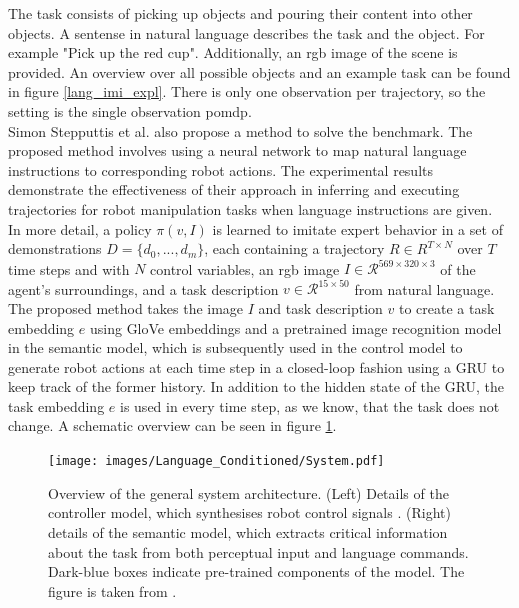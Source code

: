 The task consists of picking up objects and pouring their content into other objects. A sentense in natural language describes the task and the object. 
For example "Pick up the red cup". Additionally, an rgb image of the scene is provided. An overview over 
all possible objects and an example task can be found in figure \ref{lang_imi_expl}. 
There is only one observation per trajectory, so the setting is the single observation \ac{pomdp}.  \\


Simon Stepputtis et al. \cite{stepputtis2020languageconditioned} also propose a method to solve the benchmark. 
The proposed method involves using a neural network to map natural language instructions to 
corresponding robot actions. The experimental results demonstrate the effectiveness of their approach in inferring and executing trajectories for robot manipulation 
tasks when language instructions are given. \\

In more detail, a policy $\pi(v,I)$ is learned to imitate expert behavior in a set of demonstrations $D = \{d_0,...,d_m\}$, each containing a trajectory 
$R \in R^{T \times N}$ over $T$ time steps and with $N$ control variables, an rgb image $I \in \mathcal{R}^{569 \times 320 \times 3}$ of the agent's surroundings, 
and a task description $v \in \mathcal{R}^{15 \times 50}$ from natural language. The proposed method takes the image $I$ and task description $v$ 
to create a task embedding $e$ using GloVe embeddings and a pretrained image recognition model in the semantic model, 
which is subsequently used in the control model to generate robot actions at each time step in a closed-loop 
fashion using a GRU to keep track of the former history. In addition to the hidden state of the GRU, 
the task embedding $e$ is used in every time step, as we know, that the task does not change. A schematic overview can be seen in figure \ref{language_imitation}. \\

\begin{figure}[htbp]
    \centering
    \texttt{[image: images/Language\_Conditioned/System.pdf]}
    \caption{Overview of the general system architecture. (Left) Details of the controller model, which
    synthesises robot control signals . (Right) details of the semantic model, which extracts critical
    information about the task from both perceptual input and language commands. Dark-blue boxes
    indicate pre-trained components of the model. The figure is taken from \cite{stepputtis2020languageconditioned}.}
    \label{language_imitation}
\end{figure}

